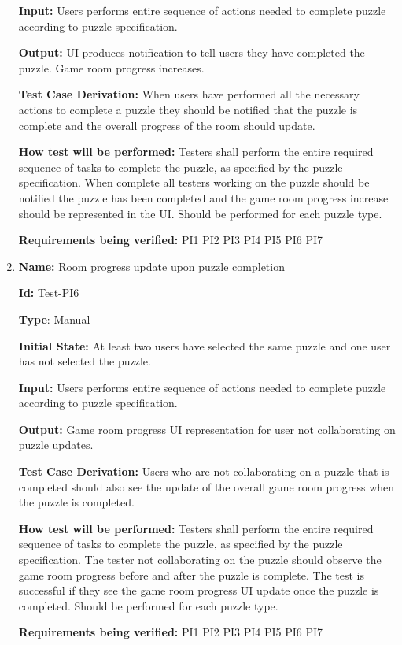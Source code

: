 \documentclass[12pt, titlepage]{article}
\begin{document}
\begin{enumerate}
\textbf{Input:} Users performs entire sequence of actions needed to complete puzzle according to puzzle specification.

\textbf{Output:} UI produces notification to tell users they have completed the puzzle. Game room progress increases.

\textbf{Test Case Derivation:}
When users have performed all the necessary actions to complete a puzzle they should be notified that the puzzle is complete and the overall progress of the room should update.

\textbf{How test will be performed:}
Testers shall perform the entire required sequence of tasks to complete the puzzle, as specified by the puzzle specification. When complete all testers working on the puzzle should be notified the puzzle has been completed and the game room progress increase should be represented in the UI. Should be performed for each puzzle type.

\textbf{Requirements being verified: } PI1 PI2 PI3 PI4 PI5 PI6 PI7

\item{\textbf{Name:} Room progress update upon puzzle completion}

\textbf{Id:} Test-PI6

\textbf{Type}: Manual

\textbf{Initial State:} At least two users have selected the same puzzle and one user has not selected the puzzle.

\textbf{Input:} Users performs entire sequence of actions needed to complete puzzle according to puzzle specification.

\textbf{Output:} Game room progress UI representation for user not collaborating on puzzle updates.

\textbf{Test Case Derivation:}
Users who are not collaborating on a puzzle that is completed should also see the update of the overall game room progress when the puzzle is completed.

\textbf{How test will be performed:}
Testers shall perform the entire required sequence of tasks to complete the puzzle, as specified by the puzzle specification. The tester not collaborating on the puzzle should observe the game room progress before and after the puzzle is complete. The test is successful if they see the game room progress UI update once the puzzle is completed. Should be performed for each puzzle type.

\textbf{Requirements being verified: } PI1 PI2 PI3 PI4 PI5 PI6 PI7


\end{enumerate}
\end{document}
